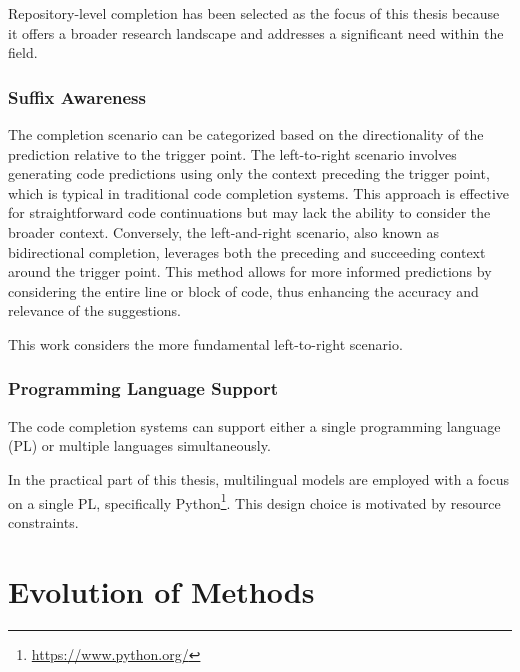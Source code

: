 Repository-level completion has been selected as the focus of this thesis because it offers a broader research landscape and addresses a significant need within the field.

\subsubsection*{Suffix Awareness}

The completion scenario can be categorized based on the directionality of the prediction relative to the trigger point. The left-to-right scenario involves generating code predictions using only the context preceding the trigger point, which is typical in traditional code completion systems. This approach is effective for straightforward code continuations but may lack the ability to consider the broader context. Conversely, the left-and-right scenario, also known as bidirectional completion, leverages both the preceding and succeeding context around the trigger point. This method allows for more informed predictions by considering the entire line or block of code, thus enhancing the accuracy and relevance of the suggestions.

This work considers the more fundamental left-to-right scenario. %

\subsubsection*{Programming Language Support}

The code completion systems can support either a single programming language (PL) or multiple languages simultaneously.

In the practical part of this thesis, multilingual models are employed with a focus on a single PL, specifically Python\footnote{\url{https://www.python.org/}}. This design choice is motivated by resource constraints.

\section{Evolution of Methods}
\label{sec:evolution-of-code-completion}


